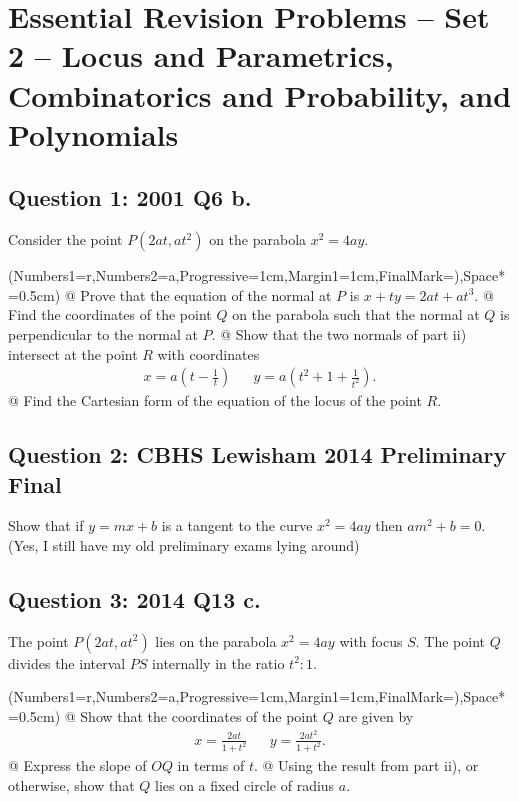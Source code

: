 \documentclass[a4paper,11pt]{article}
\begin{document}
	\section*{Essential Revision Problems -- Set 2 -- Locus and Parametrics, Combinatorics and Probability, and Polynomials}
	\subsection*{Question 1: 2001 Q6 b.}
	Consider the point $P(2at,at^2)$ on the parabola $x^2=4ay$.\\
    
	\begin{easylist}[enumerate]
		\ListProperties(Numbers1=r,Numbers2=a,Progressive=1cm,Margin1=1cm,FinalMark={)},Space*=0.5cm)
		@ Prove that the equation of the normal at $P$ is $x+ty=2at+at^3$.
        @ Find the coordinates of the point $Q$ on the parabola such that the normal at $Q$ is perpendicular to the normal at $P$.
        @ Show that the two normals of part ii) intersect at the point $R$ with coordinates 
        \begin{align*}
        x = a\left(t-\frac{1}{t}\right) && y = a\left(t^2+1+\frac{1}{t^2}\right).
        \end{align*}
        @ Find the Cartesian form of the equation of the locus of the point $R$.
	\end{easylist}
    
    \subsection*{Question 2: CBHS Lewisham 2014 Preliminary Final}
    Show that if $y=mx+b$ is a tangent to the curve $x^2=4ay$ then $am^2+b=0$.\\
    
    \noindent (Yes, I still have my old preliminary exams lying around)
    
    \subsection*{Question 3: 2014 Q13 c.}
    The point $P(2at,at^2)$ lies on the parabola $x^2=4ay$ with focus $S$. The point $Q$ divides the interval $PS$ internally in the ratio $t^2:1$.\\
    
	\begin{easylist}[enumerate]
		\ListProperties(Numbers1=r,Numbers2=a,Progressive=1cm,Margin1=1cm,FinalMark={)},Space*=0.5cm)
		@ Show that the coordinates of the point $Q$ are given by 
        \begin{align*}
        x=\frac{2at}{1+t^2} && y=\frac{2at^2}{1+t^2}.
        \end{align*}
        @ Express the slope of $OQ$ in terms of $t$.
        @ Using the result from part ii), or otherwise, show that $Q$ lies on a fixed circle of radius $a$.
	\end{easylist}
    \pagebreak
\end{document}
